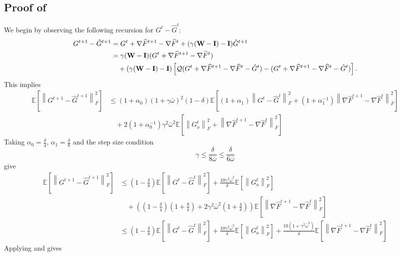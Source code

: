 \documentclass[10pt]{article} %
\theoremstyle{plain}
\theoremstyle{definition}
\theoremstyle{remark}
\newcommand{\bw}{\bar{\omega}}
\newcommand{\norm}[1]{\left\| #1 \right\|}
\newcommand{\nl}{\nonumber\\}
\newcommand{\W}{{\bf W}}
\newcommand{\I}{{\bf I}}
\newcommand{\grdSF}{\nabla \widehat{F}}
\begin{document}
\subsection{Proof of }\label{app:lemgt}
We begin by observing the following recursion for $G^{t} - \hat{G}^t$:
\begin{align*}
G^{t+1} - \hat{G}^{t+1} & = G^t + \grdSF^{t+1} - \grdSF^t + ( \gamma (\W-\I) - \I ) \hat{G}^{t+1} \nl 
& = \gamma (\W-\I) ( G^t + \grdSF^{t+1} - \grdSF^t ) \nl 
& \quad + ( \gamma (\W-\I) - \I ) \left[ {\cal Q}( G^t + \grdSF^{t+1} - \grdSF^t - \hat{G}^t  ) - (G^t + \grdSF^{t+1} - \grdSF^t - \hat{G}^t) \right] .
\end{align*}
This implies
\begin{align*}
\mathbb{E} \left[ \norm{ G^{t+1} - \hat{G}^{t+1} }_F^2 \right] & \leq (1 + \alpha_0) (1 + \gamma \bw)^2 (1 - \delta) \mathbb{E} \left[ (1+\alpha_1) \norm{ G^t- \hat{G}^t}_F^2 + (1 + \alpha_1^{-1}) \norm{ \grdSF^{t+1} - \grdSF^t }_F^2 \right] \nl 
& \quad + 2 (1 + \alpha_0^{-1}) \gamma^2 \bw^2 \mathbb{E} \left[ \norm{G_o^t}_F^2 + \norm{ \grdSF^{t+1} - \grdSF^t }_F^2 \right] 
\end{align*}
Taking $\alpha_0 = \frac{\delta}{4}$, $\alpha_1 = \frac{\delta}{8}$ and the step size condition
\[
\gamma \leq \frac{ \delta }{ 8             \bw } \leq \frac{ \delta }{ 6 \bw }
\]
give
\begin{align*}
\mathbb{E} \left[ \norm{ G^{t+1} - \hat{G}^{t+1} }_F^2 \right] & \leq \left(1 - \frac{\delta}{8} \right) \mathbb{E} \left[ \norm{ G^{t} - \hat{G}^{t} }_F^2 \right] + \frac{10 \gamma^2 \bw^2}{\delta} \mathbb{E} \left[ \norm{G_o^t}_F^2 \right] \nl
& \quad + \left( (1 - \frac{\delta}{4})(1 + \frac{8}{\delta}) + 2 \gamma^2 \bw^2 (1 + \frac{4}{\delta} ) \right) \mathbb{E} \left[ \norm{ \grdSF^{t+1} - \grdSF^t }_F^2 \right] \nl 
& \leq \left(1 - \frac{\delta}{8} \right) \mathbb{E} \left[ \norm{ G^{t} - \hat{G}^{t} }_F^2 \right] + \frac{10 \gamma^2 \bw^2}{\delta} \mathbb{E} \left[ \norm{G_o^t}_F^2 \right] + \frac{10(1+\gamma^2\bw^2)}{\delta} \mathbb{E} \left[ \norm{ \grdSF^{t+1} - \grdSF^t }_F^2 \right] 
\end{align*}
Applying  and  gives
\end{document}
